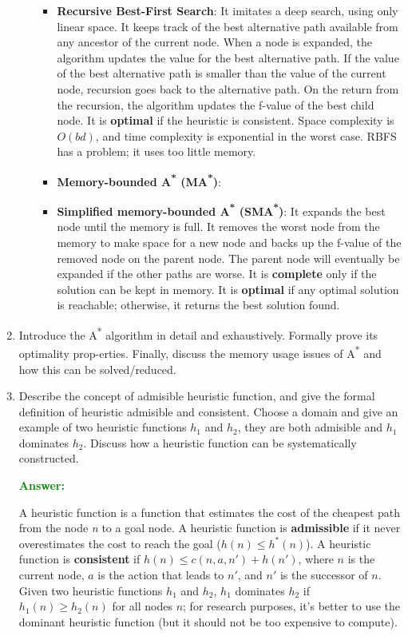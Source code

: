 \documentclass[12pt]{article}
\begin{document}
\begin{enumerate}[label=\textbf{IS.\arabic*}]
\begin{itemize}
\begin{itemize}
                        \item \textbf{Recursive Best-First Search}: It imitates a deep search, using only linear space. It keeps track of the best alternative path available from any ancestor of the current node. When a node is expanded, the algorithm updates the value for the best alternative path. If the value of the best alternative path is smaller than the value of the current node, recursion goes back to the alternative path. On the return from the recursion, the algorithm updates the f-value of the best child node. It is \textbf{optimal} if the heuristic is consistent. Space complexity is $O(bd)$, and time complexity is exponential in the worst case. RBFS has a problem; it uses too little memory.

                        \item \textbf{Memory-bounded A\textsuperscript{*} (MA\textsuperscript{*})}:

                        \item \textbf{Simplified memory-bounded A\textsuperscript{*} (SMA\textsuperscript{*})}: It expands the best node until the memory is full. It removes the worst node from the memory to make space for a new node and backs up the f-value of the removed node on the parent node. The parent node will eventually be expanded if the other paths are worse. It is \textbf{complete} only if the solution can be kept in memory. It is \textbf{optimal} if any optimal solution is reachable; otherwise, it returns the best solution found.
                    \end{itemize}
          \end{itemize}


    \item Introduce the A\textsuperscript{*} algorithm in detail and exhaustively.
          Formally prove its optimality prop-erties.
          Finally, discuss the memory usage issues of A\textsuperscript{*} and how this can be solved/reduced.

    \item Describe the concept of admisible heuristic function, and give the formal definition of heuristic admisible and consistent.
          Choose a domain and give an example of two heuristic functions $h_1$ and $h_2$, they are both admisible and $h_1$ dominates $h_2$.
          Discuss how a heuristic function can be systematically constructed.

          \textcolor{green}{\textbf{Answer:}}

          A heuristic function is a function that estimates the cost of the cheapest path from the node \textit{n} to a goal node. A heuristic function is \textbf{admissible} if it never overestimates the cost to reach the goal ($h(n) \leq h^*(n)$). A heuristic function is \textbf{consistent} if $h(n) \leq c(n, a, n') + h(n')$, where $n$ is the current node, $a$ is the action that leads to $n'$, and $n'$ is the successor of $n$. Given two heuristic functions $h_1$ and $h_2$, $h_1$ dominates $h_2$ if $h_1(n) \geq h_2(n)$ for all nodes $n$; for research purposes, it's better to use the dominant heuristic function (but it should not be too expensive to compute).


\end{enumerate}
\end{document}
